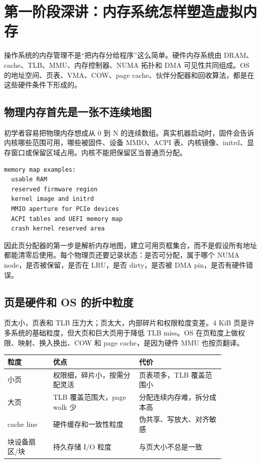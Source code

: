 \section{第一阶段深讲：内存系统怎样塑造虚拟内存}

操作系统的内存管理不是“把内存分给程序”这么简单。硬件内存系统由 DRAM、cache、TLB、MMU、内存控制器、NUMA 拓扑和 DMA 可见性共同组成。OS 的地址空间、页表、VMA、COW、page cache、伙伴分配器和回收算法，都是在这些硬件条件下形成的。

\subsection{物理内存首先是一张不连续地图}

初学者容易把物理内存想成从 0 到 N 的连续数组。真实机器启动时，固件会告诉内核哪些范围可用，哪些被固件、设备 MMIO、ACPI 表、内核镜像、initrd、显存窗口或保留区域占用。内核不能把保留区当普通页分配。

\begin{lstlisting}
memory map examples:
  usable RAM
  reserved firmware region
  kernel image and initrd
  MMIO aperture for PCIe devices
  ACPI tables and UEFI memory map
  crash kernel reserved area
\end{lstlisting}

因此页分配器的第一步是解析内存地图，建立可用页框集合，而不是假设所有地址都能清零后使用。每个物理页还要记录状态：是否可分配，属于哪个 NUMA node，是否被保留，是否在 LRU，是否 dirty，是否被 DMA pin，是否有硬件错误。

\subsection{页是硬件和 OS 的折中粒度}

页太小，页表和 TLB 压力大；页太大，内部碎片和权限粒度变差。4 KiB 页是许多系统的基础粒度，但大页和巨大页用于降低 TLB miss。OS 在页粒度上做权限、映射、换入换出、COW 和 page cache，是因为硬件 MMU 也按页翻译。

\begin{longtable}{p{0.18\linewidth}p{0.34\linewidth}p{0.34\linewidth}}
\toprule
粒度 & 优点 & 代价 \\
\midrule
小页 & 权限细，碎片小，按需分配灵活 & 页表项多，TLB 覆盖范围小 \\
大页 & TLB 覆盖范围大，page walk 少 & 分配连续内存难，拆分成本高 \\
cache line & 硬件缓存和一致性粒度 & 伪共享、写放大、对齐敏感 \\
块设备扇区/块 & 持久存储 I/O 粒度 & 与页大小不总是一致 \\
\bottomrule
\end{longtable}

